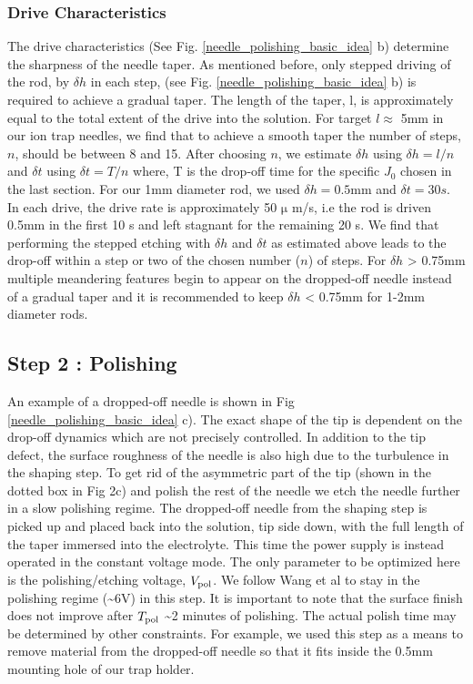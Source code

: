\documentclass[%
 aip,
 amsmath,amssymb,
 reprint,%
]{revtex4-1}
\begin{document}
\subsubsection{Drive Characteristics}
The drive characteristics (See Fig. \ref{needle_polishing_basic_idea} b) determine the sharpness of the needle taper.
As mentioned before, only stepped driving of the rod, by $\delta h$ in each step, (see Fig. \ref{needle_polishing_basic_idea} b) is required to achieve a gradual taper.
The length of the taper, l, is approximately equal to the total extent of the drive into the solution.
For target $l\approx$ 5mm in our ion trap needles, we find that to achieve a smooth taper the number of steps, $n$, should be between 8 and 15.
After choosing $n$, we estimate $\delta h$ using $\delta h = l/n$ and $\delta t$ using $\delta t = T/n$ where, T is the drop-off time for the specific $J_0$ chosen in the last section.
For our 1mm diameter rod, we used  $\delta h=0.5$mm and $\delta t=30 s$.
In each drive, the drive rate is approximately 50 $\mathrm{\mu}$ m/s, i.e the rod is driven 0.5mm in the first 10 s and left stagnant for the remaining 20 s.
We find that performing the stepped etching with $\delta h$ and $\delta t$ as estimated above leads to the drop-off within a step or two of the chosen number ($n$) of steps.
For $\delta h$ > 0.75mm multiple meandering features begin to appear on the dropped-off needle instead of a gradual taper and it is recommended to keep $\delta h$ < 0.75mm for 1-2mm diameter rods.


\subsection{Step 2 : Polishing }
An example of a dropped-off needle is shown in Fig \ref{needle_polishing_basic_idea} c).
The exact shape of the tip is dependent on the drop-off dynamics which are not precisely controlled.
In addition to the tip defect, the surface roughness of the needle is also high due to the turbulence in the shaping step.
To get rid of the asymmetric part of the tip (shown in the dotted box in Fig 2c) and polish the rest of the needle we etch the needle further in a slow polishing regime.
The dropped-off needle from the shaping step is picked up and placed back into the solution, tip side down, with the full length of the taper immersed into the electrolyte.  
This time the power supply is instead operated in the constant voltage mode. 
The only parameter to be optimized here is the polishing/etching voltage, $V_{\rm{pol}}$. 
We follow Wang et al \cite{Wang2016} to stay in the polishing regime (\textasciitilde6V) in this step.
It is important to note that the surface finish does not improve after $T_{\rm{pol}}$ \textasciitilde2 minutes of polishing. 
The actual polish time may be determined by other constraints. 
For example, we used this step as a means to remove material from the dropped-off needle so that it fits inside the 0.5mm mounting hole of our trap holder.
\end{document}
